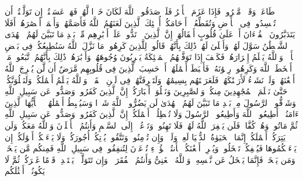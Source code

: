 \stopbuffer%
\startbuffer[\q:47:21]
طَاعَةࣱ وَقَوۡلࣱ مَّعۡرُوفࣱۚ فَإِذَا عَزَمَ ٱلۡأَمۡرُ فَلَوۡ صَدَقُوا۟ ٱللَّهَ لَكَانَ خَیۡرࣰا لَّهُمۡ%
\stopbuffer%
\startbuffer[\q:47:22]
فَهَلۡ عَسَیۡتُمۡ إِن تَوَلَّیۡتُمۡ أَن تُفۡسِدُوا۟ فِی ٱلۡأَرۡضِ وَتُقَطِّعُوۤا۟ أَرۡحَامَكُمۡ%
\stopbuffer%
\startbuffer[\q:47:23]
أُو۟لَٰۤئِكَ ٱلَّذِینَ لَعَنَهُمُ ٱللَّهُ فَأَصَمَّهُمۡ وَأَعۡمَىٰۤ أَبۡصَٰرَهُمۡ%
\stopbuffer%
\startbuffer[\q:47:24]
أَفَلَا یَتَدَبَّرُونَ ٱلۡقُرۡءَانَ أَمۡ عَلَىٰ قُلُوبٍ أَقۡفَالُهَاۤ%
\stopbuffer%
\startbuffer[\q:47:25]
إِنَّ ٱلَّذِینَ ٱرۡتَدُّوا۟ عَلَىٰۤ أَدۡبَٰرِهِم مِّنۢ بَعۡدِ مَا تَبَیَّنَ لَهُمُ ٱلۡهُدَى ٱلشَّیۡطَٰنُ سَوَّلَ لَهُمۡ وَأَمۡلَىٰ لَهُمۡ%
\stopbuffer%
\startbuffer[\q:47:26]
ذَٰلِكَ بِأَنَّهُمۡ قَالُوا۟ لِلَّذِینَ كَرِهُوا۟ مَا نَزَّلَ ٱللَّهُ سَنُطِیعُكُمۡ فِی بَعۡضِ ٱلۡأَمۡرِۖ وَٱللَّهُ یَعۡلَمُ إِسۡرَارَهُمۡ%
\stopbuffer%
\startbuffer[\q:47:27]
فَكَیۡفَ إِذَا تَوَفَّتۡهُمُ ٱلۡمَلَٰۤئِكَةُ یَضۡرِبُونَ وُجُوهَهُمۡ وَأَدۡبَٰرَهُمۡ%
\stopbuffer%
\startbuffer[\q:47:28]
ذَٰلِكَ بِأَنَّهُمُ ٱتَّبَعُوا۟ مَاۤ أَسۡخَطَ ٱللَّهَ وَكَرِهُوا۟ رِضۡوَٰنَهُۥ فَأَحۡبَطَ أَعۡمَٰلَهُمۡ%
\stopbuffer%
\startbuffer[\q:47:29]
أَمۡ حَسِبَ ٱلَّذِینَ فِی قُلُوبِهِم مَّرَضٌ أَن لَّن یُخۡرِجَ ٱللَّهُ أَضۡغَٰنَهُمۡ%
\stopbuffer%
\startbuffer[\q:47:30]
وَلَوۡ نَشَاۤءُ لَأَرَیۡنَٰكَهُمۡ فَلَعَرَفۡتَهُم بِسِیمَٰهُمۡۚ وَلَتَعۡرِفَنَّهُمۡ فِی لَحۡنِ ٱلۡقَوۡلِۚ وَٱللَّهُ یَعۡلَمُ أَعۡمَٰلَكُمۡ%
\stopbuffer%
\startbuffer[\q:47:31]
وَلَنَبۡلُوَنَّكُمۡ حَتَّىٰ نَعۡلَمَ ٱلۡمُجَٰهِدِینَ مِنكُمۡ وَٱلصَّٰبِرِینَ وَنَبۡلُوَا۟ أَخۡبَارَكُمۡ%
\stopbuffer%
\startbuffer[\q:47:32]
إِنَّ ٱلَّذِینَ كَفَرُوا۟ وَصَدُّوا۟ عَن سَبِیلِ ٱللَّهِ وَشَاۤقُّوا۟ ٱلرَّسُولَ مِنۢ بَعۡدِ مَا تَبَیَّنَ لَهُمُ ٱلۡهُدَىٰ لَن یَضُرُّوا۟ ٱللَّهَ شَیۡءࣰا وَسَیُحۡبِطُ أَعۡمَٰلَهُمۡ%
\stopbuffer%
\startbuffer[\q:47:33]
۞ یَٰۤأَیُّهَا ٱلَّذِینَ ءَامَنُوۤا۟ أَطِیعُوا۟ ٱللَّهَ وَأَطِیعُوا۟ ٱلرَّسُولَ وَلَا تُبۡطِلُوۤا۟ أَعۡمَٰلَكُمۡ%
\stopbuffer%
\startbuffer[\q:47:34]
إِنَّ ٱلَّذِینَ كَفَرُوا۟ وَصَدُّوا۟ عَن سَبِیلِ ٱللَّهِ ثُمَّ مَاتُوا۟ وَهُمۡ كُفَّارࣱ فَلَن یَغۡفِرَ ٱللَّهُ لَهُمۡ%
\stopbuffer%
\startbuffer[\q:47:35]
فَلَا تَهِنُوا۟ وَتَدۡعُوۤا۟ إِلَى ٱلسَّلۡمِ وَأَنتُمُ ٱلۡأَعۡلَوۡنَ وَٱللَّهُ مَعَكُمۡ وَلَن یَتِرَكُمۡ أَعۡمَٰلَكُمۡ%
\stopbuffer%
\startbuffer[\q:47:36]
إِنَّمَا ٱلۡحَیَوٰةُ ٱلدُّنۡیَا لَعِبࣱ وَلَهۡوࣱۚ وَإِن تُؤۡمِنُوا۟ وَتَتَّقُوا۟ یُؤۡتِكُمۡ أُجُورَكُمۡ وَلَا یَسۡءَلۡكُمۡ أَمۡوَٰلَكُمۡ%
\stopbuffer%
\startbuffer[\q:47:37]
إِن یَسۡءَلۡكُمُوهَا فَیُحۡفِكُمۡ تَبۡخَلُوا۟ وَیُخۡرِجۡ أَضۡغَٰنَكُمۡ%
\stopbuffer%
\startbuffer[\q:47:38]
هَٰۤأَنتُمۡ هَٰۤؤُلَاۤءِ تُدۡعَوۡنَ لِتُنفِقُوا۟ فِی سَبِیلِ ٱللَّهِ فَمِنكُم مَّن یَبۡخَلُۖ وَمَن یَبۡخَلۡ فَإِنَّمَا یَبۡخَلُ عَن نَّفۡسِهِۦۚ وَٱللَّهُ ٱلۡغَنِیُّ وَأَنتُمُ ٱلۡفُقَرَاۤءُۚ وَإِن تَتَوَلَّوۡا۟ یَسۡتَبۡدِلۡ قَوۡمًا غَیۡرَكُمۡ ثُمَّ لَا یَكُونُوۤا۟ أَمۡثَٰلَكُم%

